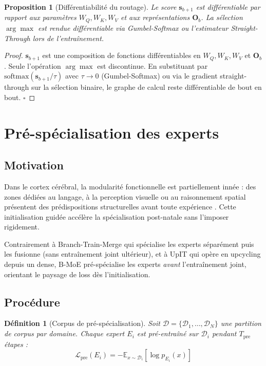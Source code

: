 \documentclass[10pt,a4paper]{article}
\newtheorem{proposition}[theorem]{Proposition}
\newtheorem{definition}{Définition}
\begin{document}
\begin{proposition}[Différentiabilité du routage]
Le score $\mathbf{s}_{b+1}$ est différentiable par rapport aux paramètres $W_Q, W_K, W_V$ et aux représentations $\mathbf{O}_b$. La sélection $\arg\max$ est rendue différentiable via Gumbel-Softmax \cite{jang2017categorical} ou l'estimateur Straight-Through \cite{bengio2013estimating} lors de l'entraînement.
\end{proposition}

\begin{proof}
$\mathbf{s}_{b+1}$ est une composition de fonctions différentiables en $W_Q, W_K, W_V$ et $\mathbf{O}_b$. Seule l'opération $\arg\max$ est discontinue. En substituant par $\mathrm{softmax}(\mathbf{s}_{b+1}/\tau)$ avec $\tau \to 0$ (Gumbel-Softmax) ou via le gradient straight-through sur la sélection binaire, le graphe de calcul reste différentiable de bout en bout. $\square$
\end{proof}

\section{Pré-spécialisation des experts}

\subsection{Motivation}

Dans le cortex cérébral, la modularité fonctionnelle est partiellement innée : des zones dédiées au langage, à la perception visuelle ou au raisonnement spatial présentent des prédispositions structurelles avant toute expérience \cite{dehaene2005neural}. Cette initialisation guidée accélère la spécialisation post-natale sans l'imposer rigidement.

Contrairement à Branch-Train-Merge \cite{li2022btm} qui spécialise les experts séparément puis les fusionne (sans entraînement joint ultérieur), et à UpIT \cite{upit2025} qui opère en upcycling depuis un dense, B-MoE pré-spécialise les experts \textit{avant} l'entraînement joint, orientant le paysage de loss dès l'initialisation.

\subsection{Procédure}

\begin{definition}[Corpus de pré-spécialisation]
Soit $\mathcal{D} = \{\mathcal{D}_1, \ldots, \mathcal{D}_N\}$ une partition de corpus par domaine. Chaque expert $E_i$ est pré-entraîné sur $\mathcal{D}_i$ pendant $T_{\mathrm{pre}}$ étapes :
\begin{equation}
  \mathcal{L}_{\mathrm{pre}}(E_i) = -\mathbb{E}_{x \sim \mathcal{D}_i}\left[\log p_{E_i}(x)\right]
\end{equation}
\end{definition}
\end{document}
